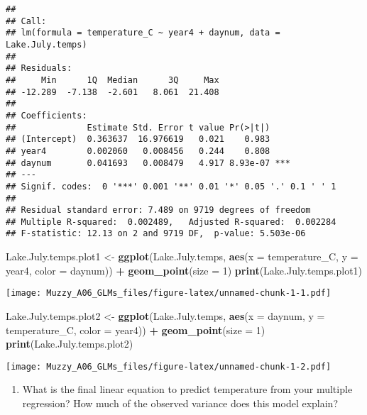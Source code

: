 \documentclass[]{article}
\newenvironment{Shaded}{\begin{snugshade}}{\end{snugshade}}
\newcommand{\KeywordTok}[1]{\textcolor[rgb]{0.13,0.29,0.53}{\textbf{#1}}}
\newcommand{\DataTypeTok}[1]{\textcolor[rgb]{0.13,0.29,0.53}{#1}}
\newcommand{\DecValTok}[1]{\textcolor[rgb]{0.00,0.00,0.81}{#1}}
\newcommand{\StringTok}[1]{\textcolor[rgb]{0.31,0.60,0.02}{#1}}
\newcommand{\OperatorTok}[1]{\textcolor[rgb]{0.81,0.36,0.00}{\textbf{#1}}}
\newcommand{\NormalTok}[1]{#1}
\providecommand{\tightlist}{%
  \setlength{\itemsep}{0pt}\setlength{\parskip}{0pt}}
\begin{document}
\begin{verbatim}
## 
## Call:
## lm(formula = temperature_C ~ year4 + daynum, data = Lake.July.temps)
## 
## Residuals:
##     Min      1Q  Median      3Q     Max 
## -12.289  -7.138  -2.601   8.061  21.408 
## 
## Coefficients:
##              Estimate Std. Error t value Pr(>|t|)    
## (Intercept)  0.363637  16.976619   0.021    0.983    
## year4        0.002060   0.008456   0.244    0.808    
## daynum       0.041693   0.008479   4.917 8.93e-07 ***
## ---
## Signif. codes:  0 '***' 0.001 '**' 0.01 '*' 0.05 '.' 0.1 ' ' 1
## 
## Residual standard error: 7.489 on 9719 degrees of freedom
## Multiple R-squared:  0.002489,   Adjusted R-squared:  0.002284 
## F-statistic: 12.13 on 2 and 9719 DF,  p-value: 5.503e-06
\end{verbatim}

\begin{Shaded}
\begin{Highlighting}[]
\NormalTok{Lake.July.temps.plot1 <-}\StringTok{ }\KeywordTok{ggplot}\NormalTok{(Lake.July.temps, }
                 \KeywordTok{aes}\NormalTok{(}\DataTypeTok{x =}\NormalTok{ temperature_C, }\DataTypeTok{y =}\NormalTok{ year4, }\DataTypeTok{color =}\NormalTok{ daynum)) }\OperatorTok{+}
\StringTok{  }\KeywordTok{geom_point}\NormalTok{(}\DataTypeTok{size =} \DecValTok{1}\NormalTok{) }
\KeywordTok{print}\NormalTok{(Lake.July.temps.plot1)}
\end{Highlighting}
\end{Shaded}

\texttt{[image: Muzzy\_A06\_GLMs\_files/figure-latex/unnamed-chunk-1-1.pdf]}

\begin{Shaded}
\begin{Highlighting}[]
\NormalTok{Lake.July.temps.plot2 <-}\StringTok{ }\KeywordTok{ggplot}\NormalTok{(Lake.July.temps, }
                 \KeywordTok{aes}\NormalTok{(}\DataTypeTok{x =}\NormalTok{ daynum, }\DataTypeTok{y =}\NormalTok{ temperature_C, }\DataTypeTok{color =}\NormalTok{ year4)) }\OperatorTok{+}
\StringTok{  }\KeywordTok{geom_point}\NormalTok{(}\DataTypeTok{size =} \DecValTok{1}\NormalTok{)}
\KeywordTok{print}\NormalTok{(Lake.July.temps.plot2)}
\end{Highlighting}
\end{Shaded}

\texttt{[image: Muzzy\_A06\_GLMs\_files/figure-latex/unnamed-chunk-1-2.pdf]}

\begin{enumerate}
\def\labelenumi{\arabic{enumi}.}
\setcounter{enumi}{12}
\tightlist
\item
  What is the final linear equation to predict temperature from your
  multiple regression? How much of the observed variance does this model
  explain?
\end{enumerate}
\end{document}
